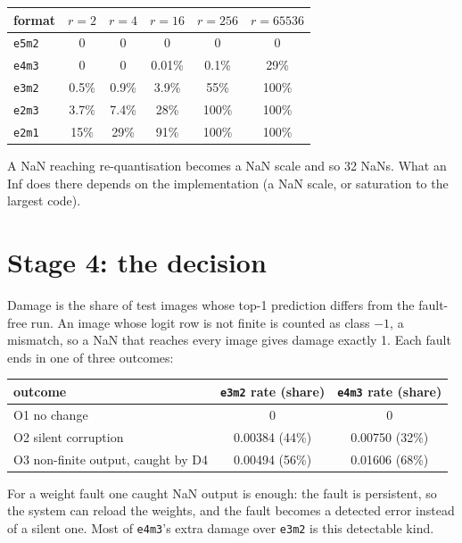 \documentclass[10pt,a4paper]{article}
\newcommand{\fmt}[1]{\texttt{#1}}
\begin{document}
\begin{center}
\begin{tabular}{lccccc}
\toprule
format & $r=2$ & $r=4$ & $r=16$ & $r=256$ & $r=65536$ \\
\midrule
\fmt{e5m2} & 0 & 0 & 0 & 0 & 0 \\
\fmt{e4m3} & 0 & 0 & 0.01\% & 0.1\% & 29\% \\
\fmt{e3m2} & 0.5\% & 0.9\% & 3.9\% & 55\% & 100\% \\
\fmt{e2m3} & 3.7\% & 7.4\% & 28\% & 100\% & 100\% \\
\fmt{e2m1} & 15\% & 29\% & 91\% & 100\% & 100\% \\
\bottomrule
\end{tabular}
\end{center}

\begin{description}[leftmargin=1.2em,style=nextline]
  \item[P8 NaN at re-quantisation.] A NaN reaching re-quantisation becomes a NaN scale and so 32
        NaNs. What an Inf does there depends on the implementation (a NaN scale, or saturation to
        the largest code).
\end{description}

\section{Stage 4: the decision}

Damage is the share of test images whose top-1 prediction differs from the fault-free run. An
image whose logit row is not finite is counted as class $-1$, a mismatch, so a NaN that reaches
every image gives damage exactly 1. Each fault ends in one of three outcomes:

\begin{center}
\begin{tabular}{lcc}
\toprule
outcome & \fmt{e3m2} rate (share) & \fmt{e4m3} rate (share) \\
\midrule
O1 no change & 0 & 0 \\
O2 silent corruption & 0.00384 (44\%) & 0.00750 (32\%) \\
O3 non-finite output, caught by D4 & 0.00494 (56\%) & 0.01606 (68\%) \\
\bottomrule
\end{tabular}
\end{center}

For a weight fault one caught NaN output is enough: the fault is persistent, so the system can
reload the weights, and the fault becomes a detected error instead of a silent one. Most of
\fmt{e4m3}'s extra damage over \fmt{e3m2} is this detectable kind.
\end{document}
